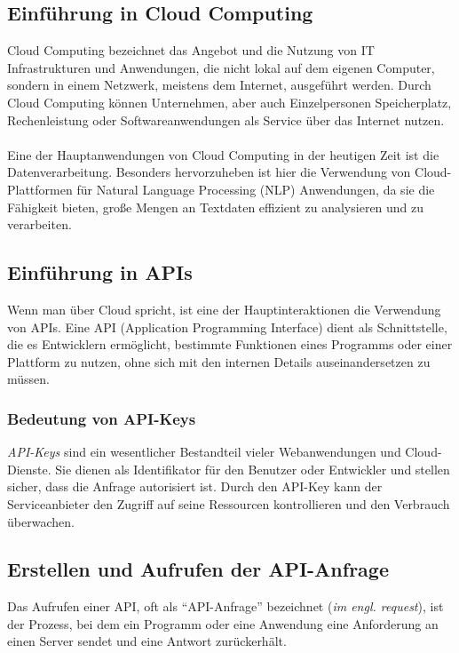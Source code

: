 \documentclass[12pt,a4paper]{article}
\begin{document}
\subsection{Einführung in Cloud Computing}
Cloud Computing bezeichnet das Angebot und die Nutzung von IT Infrastrukturen und Anwendungen, die nicht lokal auf dem eigenen Computer, sondern in einem Netzwerk, meistens dem Internet, ausgeführt werden. Durch Cloud Computing können Unternehmen, aber auch Einzelpersonen Speicherplatz, Rechenleistung oder Softwareanwendungen als Service über das Internet nutzen.
\\ \\
Eine der Hauptanwendungen von Cloud Computing in der heutigen Zeit ist die Datenverarbeitung. Besonders hervorzuheben ist hier die Verwendung von Cloud-Plattformen für Natural Language Processing (NLP) Anwendungen, da sie die Fähigkeit bieten, große Mengen an Textdaten effizient zu analysieren und zu verarbeiten.

\subsection{Einführung in APIs}
Wenn man über Cloud spricht, ist eine der Hauptinteraktionen die Verwendung von APIs. Eine API (Application Programming Interface) dient als Schnittstelle, die es Entwicklern ermöglicht, bestimmte Funktionen eines Programms oder einer Plattform zu nutzen, ohne sich mit den internen Details auseinandersetzen zu müssen.

\subsubsection{Bedeutung von API-Keys}
\textit{API-Keys} sind ein wesentlicher Bestandteil vieler Webanwendungen und Cloud-Dienste. Sie dienen als Identifikator für den Benutzer oder Entwickler und stellen sicher, dass die Anfrage autorisiert ist. Durch den API-Key kann der Serviceanbieter den Zugriff auf seine Ressourcen kontrollieren und den Verbrauch überwachen.

\subsection{Erstellen und Aufrufen der API-Anfrage}
Das Aufrufen einer API, oft als \enquote{API-Anfrage} bezeichnet (\textit{im engl. request}), ist der Prozess, bei dem ein Programm oder eine Anwendung eine Anforderung an einen Server sendet und eine Antwort zurückerhält.
\end{document}
